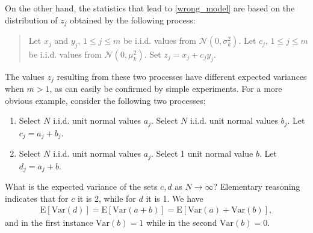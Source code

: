 \documentclass[12pt]{article}
\newcommand{\Var}{\mathrm{Var}}
\newcommand{\E}{\mathrm{E}}
\begin{document}
On the other hand, the statistics that lead to \eqref{wrong_model} are based on the
distribution of $z_j$ obtained by the following process:
\begin{quote}
Let $x_j$ and $y_j$, $1\le j \le m$ be i.i.d. values from ${\mathcal N}(0,\sigma^2_k)$.
Let $c_j$, $1\le j \le m$ be i.i.d. values from ${\mathcal N}(0,\mu^2_k)$.  Set $z_j = x_j + c_j y_j$.
\end{quote}

The values $z_j$ resulting from these two processes have different expected variances when $m>1$,
as can easily be confirmed by simple experiments.  For a more obvious example, consider
the following two processes:
\begin{enumerate}
    \item Select $N$ i.i.d. unit normal values $a_j$.  Select $N$ i.i.d.
            unit normal values $b_j$.  Let $c_j=a_j+b_j$.

    \item Select $N$ i.i.d. unit normal values $a_j$.  Select 1
            unit normal value $b$.  Let $d_j=a_j+b$.
\end{enumerate}
What is the expected variance of the sets $c,d$ as $N\to\infty$?
Elementary reasoning indicates that for $c$ it is 2, while for $d$ it is 1.  We have
\begin{align}
\E[\Var(d)] = \E[\Var(a+b)] = \E[\Var(a)+\Var(b)],
\end{align}
and in the first instance $\Var(b)=1$ while in the second $\Var(b)=0$.
\end{document}
